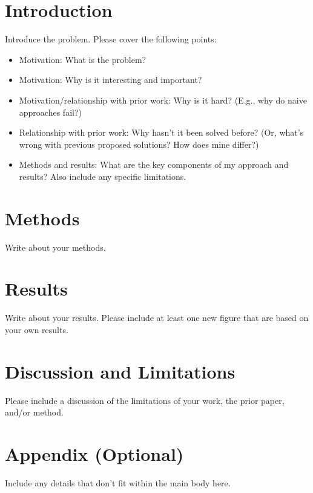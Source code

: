 \documentclass{article}
\begin{document}
\section{Introduction}

Introduce the problem. Please cover the following points:
\begin{itemize}
    \item Motivation: What is the problem?
    \item Motivation: Why is it interesting and important?
    \item Motivation/relationship with prior work: Why is it hard? (E.g., why do naive approaches fail?)
    \item Relationship with prior work: Why hasn't it been solved before? (Or, what's wrong with previous proposed solutions? How does mine differ?)
    \item Methods and results: What are the key components of my approach and results? Also include any specific limitations.
\end{itemize}

\section{Methods}

Write about your methods.

\section{Results}

Write about your results. Please include at least one new figure that are based on your own results.

\section{Discussion and Limitations}
Please include a discussion of the limitations of your work, the prior paper, and/or method.

{\footnotesize



}

\section{Appendix (Optional)}

Include any details that don't fit within the main body here.
\end{document}
